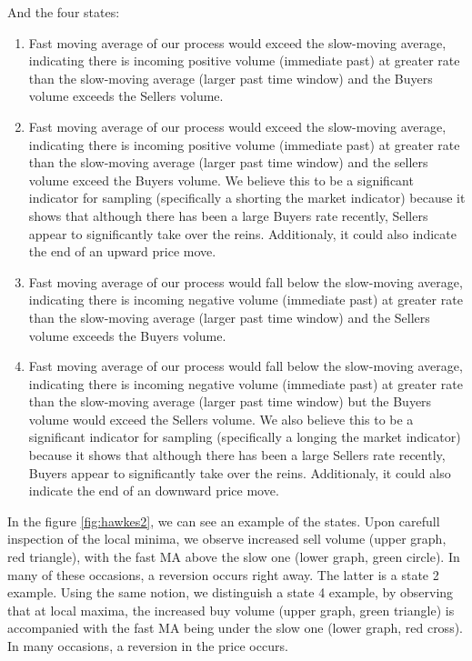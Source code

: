And the four states:
\begin{enumerate}
\item Fast moving average of our process would exceed the slow-moving average, indicating there is incoming positive volume (immediate past) at greater rate than the slow-moving average (larger past time window) and the Buyers volume exceeds the Sellers volume.
\item Fast moving average of our process would exceed the slow-moving average, indicating there is incoming positive volume (immediate past) at greater rate than the slow-moving average (larger past time window) and the sellers volume exceed the Buyers volume. We believe this to be a significant indicator for sampling (specifically a shorting the market indicator) because it shows that although there has been a large Buyers rate recently, Sellers appear to significantly take over the reins. Additionaly, it could also indicate the end of an upward price move.
\item Fast moving average of our process would fall below the slow-moving average, indicating there is incoming negative volume (immediate past) at greater rate than the slow-moving average (larger past time window) and the Sellers volume exceeds the Buyers volume.
\item Fast moving average of our process would fall below the slow-moving average, indicating there is incoming negative volume (immediate past) at greater rate than the slow-moving average (larger past time window) but the Buyers volume would exceed the Sellers volume. We also believe this to be a significant indicator for sampling (specifically a longing the market indicator) because it shows that although there has been a large Sellers rate recently, Buyers appear to significantly take over the reins. Additionaly, it could also indicate the end of an downward price move.
\end{enumerate}

In the figure \ref{fig:hawkes2}, we can see an example of the states. Upon carefull inspection of the local minima, we observe increased sell volume (upper graph, red triangle), with the fast MA above the slow one (lower graph, green circle). In many of these occasions, a reversion occurs right away. The latter is a state 2 example. Using the same notion, we distinguish a state 4 example, by observing that at local maxima, the increased buy volume (upper graph, green triangle) is accompanied with the fast MA being under the slow one (lower graph, red cross). In many occasions, a reversion in the price occurs. 

